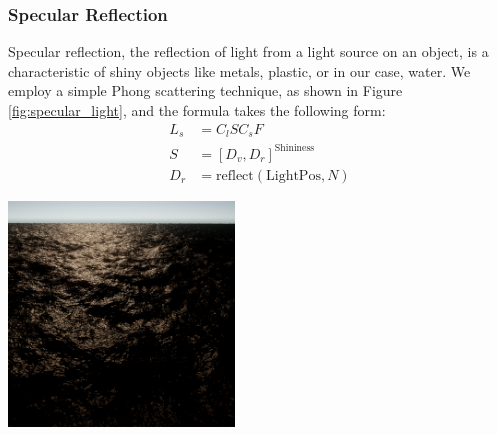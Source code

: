 \subsubsection{Specular Reflection}
Specular reflection, the reflection of light from a light source on an object, is a characteristic of shiny objects like metals, plastic, or in our case, water. We employ a simple Phong scattering technique, as shown in Figure \ref{fig:specular_light}, and the formula takes the following form:
\begin{equation}
    \begin{split}
        L_s &= C_l S C_s F\\
        S &= [D_v, D_r]^{\text{Shininess}}\\
        D_r &= \text{reflect}(\text{LightPos}, N)
    \end{split}
\end{equation}
\begin{minipage}{1\textwidth}
    \centering
    \includegraphics[width=0.45\textwidth]{"images/specular_light.png"}
    \label{fig:specular_light}
\end{minipage}

